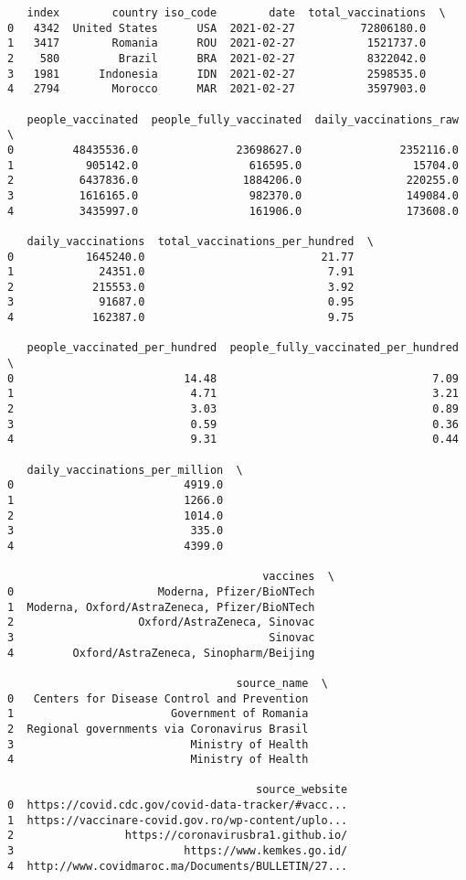 \documentclass[11pt]{article}
\begin{document}
    
    \begin{verbatim}
   index        country iso_code        date  total_vaccinations  \
0   4342  United States      USA  2021-02-27          72806180.0   
1   3417        Romania      ROU  2021-02-27           1521737.0   
2    580         Brazil      BRA  2021-02-27           8322042.0   
3   1981      Indonesia      IDN  2021-02-27           2598535.0   
4   2794        Morocco      MAR  2021-02-27           3597903.0   

   people_vaccinated  people_fully_vaccinated  daily_vaccinations_raw  \
0         48435536.0               23698627.0               2352116.0   
1           905142.0                 616595.0                 15704.0   
2          6437836.0                1884206.0                220255.0   
3          1616165.0                 982370.0                149084.0   
4          3435997.0                 161906.0                173608.0   

   daily_vaccinations  total_vaccinations_per_hundred  \
0           1645240.0                           21.77   
1             24351.0                            7.91   
2            215553.0                            3.92   
3             91687.0                            0.95   
4            162387.0                            9.75   

   people_vaccinated_per_hundred  people_fully_vaccinated_per_hundred  \
0                          14.48                                 7.09   
1                           4.71                                 3.21   
2                           3.03                                 0.89   
3                           0.59                                 0.36   
4                           9.31                                 0.44   

   daily_vaccinations_per_million  \
0                          4919.0   
1                          1266.0   
2                          1014.0   
3                           335.0   
4                          4399.0   

                                       vaccines  \
0                      Moderna, Pfizer/BioNTech   
1  Moderna, Oxford/AstraZeneca, Pfizer/BioNTech   
2                   Oxford/AstraZeneca, Sinovac   
3                                       Sinovac   
4         Oxford/AstraZeneca, Sinopharm/Beijing   

                                   source_name  \
0   Centers for Disease Control and Prevention   
1                        Government of Romania   
2  Regional governments via Coronavirus Brasil   
3                           Ministry of Health   
4                           Ministry of Health   

                                      source_website  
0  https://covid.cdc.gov/covid-data-tracker/#vacc...  
1  https://vaccinare-covid.gov.ro/wp-content/uplo...  
2                 https://coronavirusbra1.github.io/  
3                          https://www.kemkes.go.id/  
4  http://www.covidmaroc.ma/Documents/BULLETIN/27...  
    \end{verbatim}
\end{document}
